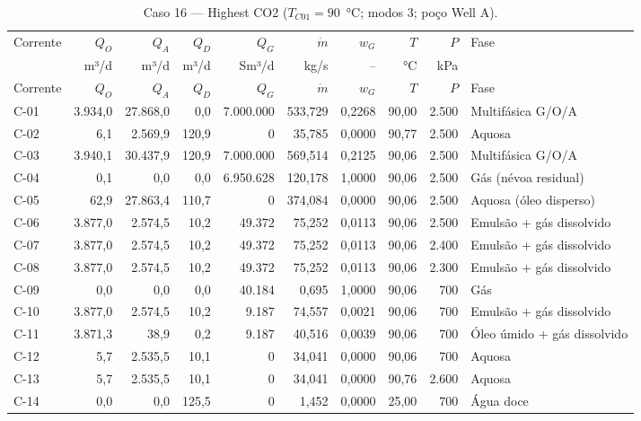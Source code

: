 \documentclass[11pt,a4paper]{article}
\numberwithin{equation}{section}
\numberwithin{table}{section}
\numberwithin{figure}{section}
\begin{document}
{\footnotesize\setlength{\tabcolsep}{3pt}\begin{longtable}{lrrrrrrrrL{2.5cm}}
\caption{Caso 16 --- Highest CO2 ($T_{C01}=90$~°C; modos 3; poço Well A).}\\\toprule
Corrente & $Q_O$ & $Q_A$ & $Q_D$ & $Q_G$ & $\dot m$ & $w_G$ & $T$ & $P$ & Fase\\ & m³/d & m³/d & m³/d & Sm³/d & kg/s & -- & °C & kPa & \\\midrule\endfirsthead
\toprule Corrente & $Q_O$ & $Q_A$ & $Q_D$ & $Q_G$ & $\dot m$ & $w_G$ & $T$ & $P$ & Fase\\\midrule\endhead
C-01 & 3.934,0 & 27.868,0 & 0,0 & 7.000.000 & 533,729 & 0,2268 & 90,00 & 2.500 & {\scriptsize Multifásica G/O/A}\\
C-02 & 6,1 & 2.569,9 & 120,9 & 0 & 35,785 & 0,0000 & 90,77 & 2.500 & {\scriptsize Aquosa}\\
C-03 & 3.940,1 & 30.437,9 & 120,9 & 7.000.000 & 569,514 & 0,2125 & 90,06 & 2.500 & {\scriptsize Multifásica G/O/A}\\
C-04 & 0,1 & 0,0 & 0,0 & 6.950.628 & 120,178 & 1,0000 & 90,06 & 2.500 & {\scriptsize Gás (névoa residual)}\\
C-05 & 62,9 & 27.863,4 & 110,7 & 0 & 374,084 & 0,0000 & 90,06 & 2.500 & {\scriptsize Aquosa (óleo disperso)}\\
C-06 & 3.877,0 & 2.574,5 & 10,2 & 49.372 & 75,252 & 0,0113 & 90,06 & 2.500 & {\scriptsize Emulsão + gás dissolvido}\\
C-07 & 3.877,0 & 2.574,5 & 10,2 & 49.372 & 75,252 & 0,0113 & 90,06 & 2.400 & {\scriptsize Emulsão + gás dissolvido}\\
C-08 & 3.877,0 & 2.574,5 & 10,2 & 49.372 & 75,252 & 0,0113 & 90,06 & 2.300 & {\scriptsize Emulsão + gás dissolvido}\\
C-09 & 0,0 & 0,0 & 0,0 & 40.184 & 0,695 & 1,0000 & 90,06 & 700 & {\scriptsize Gás}\\
C-10 & 3.877,0 & 2.574,5 & 10,2 & 9.187 & 74,557 & 0,0021 & 90,06 & 700 & {\scriptsize Emulsão + gás dissolvido}\\
C-11 & 3.871,3 & 38,9 & 0,2 & 9.187 & 40,516 & 0,0039 & 90,06 & 700 & {\scriptsize Óleo úmido + gás dissolvido}\\
C-12 & 5,7 & 2.535,5 & 10,1 & 0 & 34,041 & 0,0000 & 90,06 & 700 & {\scriptsize Aquosa}\\
C-13 & 5,7 & 2.535,5 & 10,1 & 0 & 34,041 & 0,0000 & 90,76 & 2.600 & {\scriptsize Aquosa}\\
C-14 & 0,0 & 0,0 & 125,5 & 0 & 1,452 & 0,0000 & 25,00 & 700 & {\scriptsize Água doce}\\

\end{longtable}}
\end{document}
